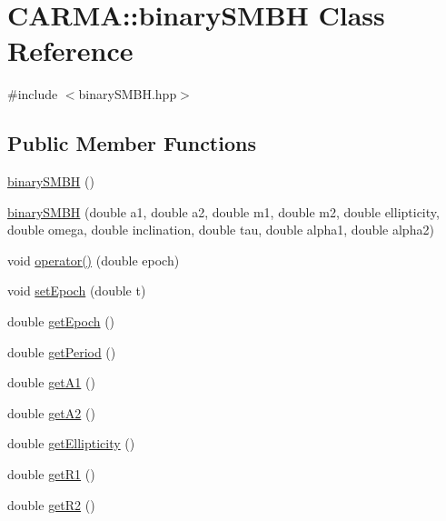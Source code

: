 \hypertarget{class_c_a_r_m_a_1_1binary_s_m_b_h}{\section{C\-A\-R\-M\-A\-:\-:binary\-S\-M\-B\-H Class Reference}
\label{class_c_a_r_m_a_1_1binary_s_m_b_h}
}


{\ttfamily \#include $<$binary\-S\-M\-B\-H.\-hpp$>$}

\subsection*{Public Member Functions}
\begin{DoxyCompactItemize}
\item 
\hyperlink{class_c_a_r_m_a_1_1binary_s_m_b_h_a6cf6e0bede1d58f798da6273750cd90d}{binary\-S\-M\-B\-H} ()
\item 
\hyperlink{class_c_a_r_m_a_1_1binary_s_m_b_h_a9c99af3de599e42901364675ecebe49f}{binary\-S\-M\-B\-H} (double a1, double a2, double m1, double m2, double ellipticity, double omega, double inclination, double tau, double alpha1, double alpha2)
\item 
void \hyperlink{class_c_a_r_m_a_1_1binary_s_m_b_h_a4a055846bd801871127d5d480bdd568e}{operator()} (double epoch)
\item 
void \hyperlink{class_c_a_r_m_a_1_1binary_s_m_b_h_a29b72b2cf6d548d1e434c9d68c56a6d7}{set\-Epoch} (double t)
\item 
double \hyperlink{class_c_a_r_m_a_1_1binary_s_m_b_h_a2e9d415057dcb192310a68bf3db1d742}{get\-Epoch} ()
\item 
double \hyperlink{class_c_a_r_m_a_1_1binary_s_m_b_h_aae338bc630a93fbcbb0c1623021e726f}{get\-Period} ()
\item 
double \hyperlink{class_c_a_r_m_a_1_1binary_s_m_b_h_aef1e3cff1cda9422fc084d86a5adfa86}{get\-A1} ()
\item 
double \hyperlink{class_c_a_r_m_a_1_1binary_s_m_b_h_a87651fd455460ce8bf9772235bf85f4a}{get\-A2} ()
\item 
double \hyperlink{class_c_a_r_m_a_1_1binary_s_m_b_h_a0d9cafe27bed9985305b84a083260811}{get\-Ellipticity} ()
\item 
double \hyperlink{class_c_a_r_m_a_1_1binary_s_m_b_h_a35203f4c1e7fc0d68f4eb0fbbd9112e4}{get\-R1} ()
\item 
double \hyperlink{class_c_a_r_m_a_1_1binary_s_m_b_h_ac992c6780ae47e6451fb8f6dd04b5c09}{get\-R2} ()
\item 

\end{DoxyCompactItemize}
